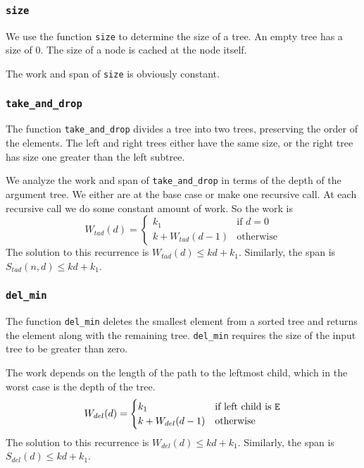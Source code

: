 \documentclass[12pt,letterpaper]{article}
\newcommand{\T}[1]{\texttt{#1}}
\begin{document}
\subsubsection{\T{size}} 
We use the function \T{size} to determine the size of a tree.
An empty tree has a size of 0.
The size of a node is cached at the node itself.

The work and span of \T{size} is obviously constant.

\subsubsection{\T{take\_and\_drop}}
The function \T{take\_and\_drop} divides a tree into two trees, preserving the order of the elements.
The left and right trees either have the same size, or the right tree has size one greater than the left subtree.

We analyze the work and span of \T{take\_and\_drop} in terms of the depth of the argument tree.
We either are at the base case or make one recursive call.
At each recursive call we do some constant amount of work.
So the work is
\[ W_{tad}(d) =
  \begin{cases}
    k_1 &\text{if }d=0\\
    k + W_{tad}(d-1) &\text{otherwise}
  \end{cases}
\]
The solution to this recurrence is $W_{tad}(d) \leq kd + k_1$.
Similarly, the span is $S_{tad}(n, d) \leq kd + k_1$.

\subsubsection{\T{del\_min}}
The function \T{del\_min} deletes the smallest element from a sorted tree and returns the element along with the remaining tree.
\T{del\_min} requires the size of the input tree to be greater than zero.

The work depends on the length of the path to the leftmost child, which in the worst case is the depth of the tree. 
\[ W_{del}(d) =
  \begin{cases}
    k_1 & \text{if left child is \T{E}}\\
    k + W_{del}(d-1) &\text{otherwise}
  \end{cases}
\]
The solution to this recurrence is $W_{del}(d) \leq kd + k_1$.
Similarly, the span is $S_{del}(d) \leq kd + k_1$.
\end{document}
